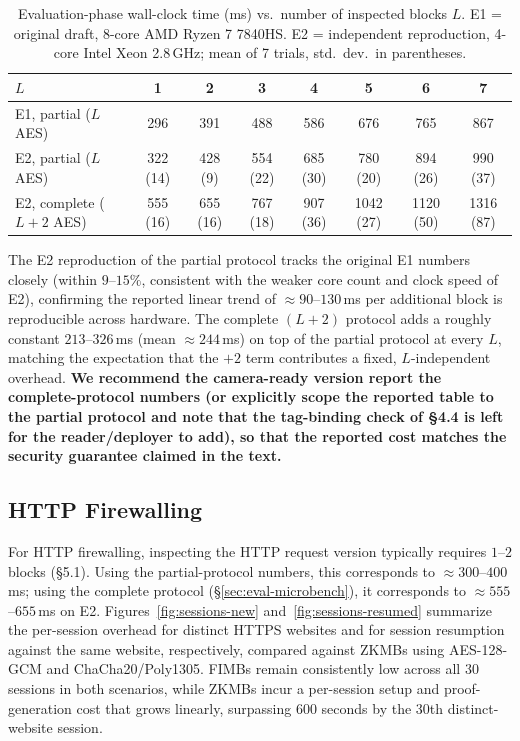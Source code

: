 \begin{table}[t]
\centering
\caption{Evaluation-phase wall-clock time (ms) vs.\ number of inspected
blocks $L$. E1 = original draft, 8-core AMD Ryzen 7 7840HS. E2 =
independent reproduction, 4-core Intel Xeon 2.8\,GHz; mean of 7 trials,
std.\ dev.\ in parentheses.}
\label{tab:microbench}
\begin{tabular}{lccccccc}
\toprule
$L$ & 1 & 2 & 3 & 4 & 5 & 6 & 7 \\
\midrule
E1, partial ($L$ AES) & 296 & 391 & 488 & 586 & 676 & 765 & 867 \\
E2, partial ($L$ AES) & 322 (14) & 428 (9) & 554 (22) & 685 (30) & 780 (20) & 894 (26) & 990 (37) \\
E2, complete ($L{+}2$ AES) & 555 (16) & 655 (16) & 767 (18) & 907 (36) & 1042 (27) & 1120 (50) & 1316 (87) \\
\bottomrule
\end{tabular}
\end{table}

The E2 reproduction of the partial protocol tracks the original E1
numbers closely (within $9$--$15\%$, consistent with the weaker
core count and clock speed of E2), confirming the reported linear
trend of $\approx 90$--$130$\,ms per additional block is reproducible
across hardware. The complete $(L+2)$ protocol adds a roughly constant
$213$--$326$\,ms (mean $\approx 244$\,ms) on top of the partial
protocol at every $L$, matching the expectation that the $+2$ term
contributes a fixed, $L$-independent overhead. \textbf{We recommend
the camera-ready version report the complete-protocol numbers (or
explicitly scope the reported table to the partial protocol and note
that the tag-binding check of \S4.4 is left for the reader/deployer to
add), so that the reported cost matches the security guarantee
claimed in the text.}

\subsection{HTTP Firewalling}
\label{sec:eval-http}

For HTTP firewalling, inspecting the HTTP request version typically
requires $1$--$2$ blocks (\S5.1). Using the partial-protocol numbers,
this corresponds to $\approx 300$--$400$\,ms; using the complete
protocol (\S\ref{sec:eval-microbench}), it corresponds to
$\approx 555$--$655$\,ms on E2. Figures~\ref{fig:sessions-new}
and~\ref{fig:sessions-resumed} summarize the per-session overhead for
distinct HTTPS websites and for session resumption against the same
website, respectively, compared against ZKMBs using AES-128-GCM and
ChaCha20/Poly1305. FIMBs remain consistently low across all $30$
sessions in both scenarios, while ZKMBs incur a per-session setup and
proof-generation cost that grows linearly, surpassing $600$ seconds
by the 30th distinct-website session.

